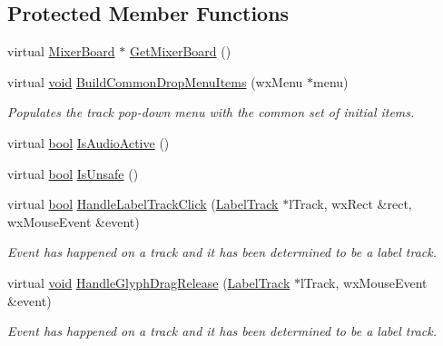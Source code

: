 \subsection*{Protected Member Functions}
\begin{DoxyCompactItemize}
\item 
virtual \hyperlink{class_mixer_board}{Mixer\+Board} $\ast$ \hyperlink{class_track_panel_a9d640aa69ffac9fe8e4a9bfba58ce876}{Get\+Mixer\+Board} ()
\item 
virtual \hyperlink{sound_8c_ae35f5844602719cf66324f4de2a658b3}{void} \hyperlink{class_track_panel_a47fbe24cbead00d10a83a1b411132d35}{Build\+Common\+Drop\+Menu\+Items} (wx\+Menu $\ast$menu)
\begin{DoxyCompactList}\small\item\em Populates the track pop-\/down menu with the common set of initial items. \end{DoxyCompactList}\item 
virtual \hyperlink{mac_2config_2i386_2lib-src_2libsoxr_2soxr-config_8h_abb452686968e48b67397da5f97445f5b}{bool} \hyperlink{class_track_panel_ac869cf3afecdf74bd6b9faf18c85e6fc}{Is\+Audio\+Active} ()
\item 
virtual \hyperlink{mac_2config_2i386_2lib-src_2libsoxr_2soxr-config_8h_abb452686968e48b67397da5f97445f5b}{bool} \hyperlink{class_track_panel_a4caaa6ebfd2efcb5596d50bf317a3f54}{Is\+Unsafe} ()
\item 
virtual \hyperlink{mac_2config_2i386_2lib-src_2libsoxr_2soxr-config_8h_abb452686968e48b67397da5f97445f5b}{bool} \hyperlink{class_track_panel_aa9dd18c1cdb37737045a87617db85323}{Handle\+Label\+Track\+Click} (\hyperlink{class_label_track}{Label\+Track} $\ast$l\+Track, wx\+Rect \&rect, wx\+Mouse\+Event \&event)
\begin{DoxyCompactList}\small\item\em Event has happened on a track and it has been determined to be a label track. \end{DoxyCompactList}\item 
virtual \hyperlink{sound_8c_ae35f5844602719cf66324f4de2a658b3}{void} \hyperlink{class_track_panel_a984cfefe6eb6bcc49b44d1b2346ef166}{Handle\+Glyph\+Drag\+Release} (\hyperlink{class_label_track}{Label\+Track} $\ast$l\+Track, wx\+Mouse\+Event \&event)
\begin{DoxyCompactList}\small\item\em Event has happened on a track and it has been determined to be a label track. \end{DoxyCompactList}\item 

\end{DoxyCompactItemize}
